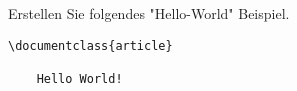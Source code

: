 Erstellen Sie folgendes "Hello-World" Beispiel.
\begin{verbatim}
\documentclass{article}

    Hello World!

\end{verbatim}
